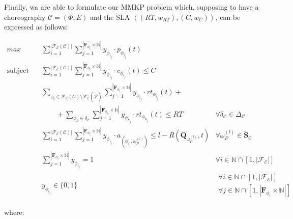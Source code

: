 \documentclass[12pt,a4paper]{report}
\newcommand{\N}{\mathbb{N}}
\begin{document}
Finally, wa are able to formulate our MMKP problem which, supposing to have a choreography $\mathcal{C} = (\Phi,E)$ and the SLA $\left\langle (RT,w_{RT}),(C,w_{C}) \right\rangle$, can be expressed as follows:

\begin{align}
	\displaystyle max \quad & \displaystyle \sum_{i = 1}^{|\mathscr{F_E}(\mathcal{C})|}  \sum_{j = 1}^{|\textbf{F}_{\phi_{i}} \times \N|} y_{\phi_{i_{j}}} \cdot p_{\phi_{i_{j}}}(t) & \label{MMPKObjective}\\	
	\text{subject to} \quad  & \displaystyle \sum_{i = 1}^{|\mathscr{F_E}(\mathcal{C})|}  \sum_{j = 1}^{|\textbf{F}_{\phi_{i}} \times \N|} y_{\phi_{i_{j}}} \cdot c_{\phi_{i_{j}}}(t) \leq C & \label{MMPKCost} \\
	& \displaystyle \sum_{\phi_i \in \mathscr{F_E}(\mathcal{C}) \setminus \mathscr{F_E}(\mathcal{\widetilde{P}})}  \sum_{j = 1}^{|\textbf{F}_{\phi_{i}} \times \N|} y_{\phi_{i_{j}}} \cdot rt_{\phi_{i_{j}}}(t) + \nonumber \\
	& \qquad + \sum_{\phi_h \in \delta_{\mathcal{C}}}  \sum_{j = 1}^{|\textbf{F}_{\phi_{h}} \times \N|} y_{\phi_{h_{j}}} \cdot rt_{\phi_{h_{j}}}(t) \leq RT \label{MMPKDelay} & 
	\forall \delta_{\mathcal{C}} \in \Delta_{\mathcal{C}} \\	
	& \displaystyle \sum_{i = 1}^{|\mathscr{F_E}(\mathcal{C})|}  \sum_{j = 1}^{|\textbf{F}_{\phi_{i}} \times \N|} y_{\phi_{i_{j}}} \cdot a_{(\phi_{i_{j}},\omega_{P}^{(l)})} \leq l - R(\textbf{Q}_{\omega_{P}^{(l)}}, t) &  \forall \omega_{P}^{(l)} \in \widetilde{\textbf{S}}_{\mathcal{C}} \label{MMPKCapacity} \\
	& \displaystyle \sum_{j = 1}^{|\textbf{F}_{\phi_{i}} \times \N|} y_{\phi_{i_{j}}} = 1 & \forall i \in \N \cap \left[ 1, |\mathscr{F_E}| \right] \label{MMPKOvvio} \\
	& y_{\phi_{i_{j}}} \in \lbrace 0, 1 \rbrace &
	\begin{array}{r}
		\forall i \in \N \cap \left[ 1, |\mathscr{F_E}| \right] \\ \forall j \in \N \cap [1,|\textbf{F}_{\phi_{i}} \times \N|] \label{MMPKOvvio2}
	\end{array}
\end{align}


where:
\end{document}
